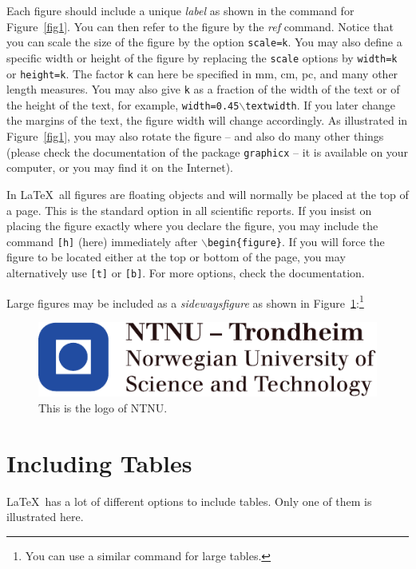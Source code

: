 Each figure should include a unique \emph{label} as shown in the command for Figure~\ref{fig1}. You can then refer to the figure by the \emph{ref} command.
Notice that you can scale the size of the figure by the option \texttt{scale=k}. You may also define a specific width or height of the figure by replacing the \texttt{scale} options by \texttt{width=k} or \texttt{height=k}. The factor \texttt{k} can here be specified in mm, cm, pc, and many other length measures. You may also give \texttt{k} as a fraction of the width of the text or of the height of the text, for example, \texttt{width=0.45$\backslash$textwidth}. If you later change the margins of the text, the figure width will change accordingly. As illustrated in Figure~\ref{fig1}, you may also rotate the figure -- and also do many other things (please check the documentation of the package \texttt{graphicx} -- it is available on your computer, or you may find it on the Internet).

In \LaTeX\ all figures are floating objects and will normally be placed at the top of a page. This is the standard option in all scientific reports. If you insist on placing the figure exactly where you declare the figure, you may include the command \texttt{[h]} (here) immediately after $\backslash$\texttt{begin\{figure\}}. If you will force the figure to be located either at the top or bottom of the page, you may alternatively use  \texttt{[t]} or \texttt{[b]}. For more options, check the documentation.

Large figures may be included as a \emph{sidewaysfigure} as shown in Figure~\ref{fig2}:\footnote{You can use a similar command for large tables.}
\begin{figure}
\centering
\includegraphics[scale=1.8]{fig/NTNU}
\caption{This is the logo of NTNU.}
\label{fig2}
\end{figure}

\section{Including Tables}
\LaTeX\ has a lot of different options to include tables. Only one of them is illustrated here.

